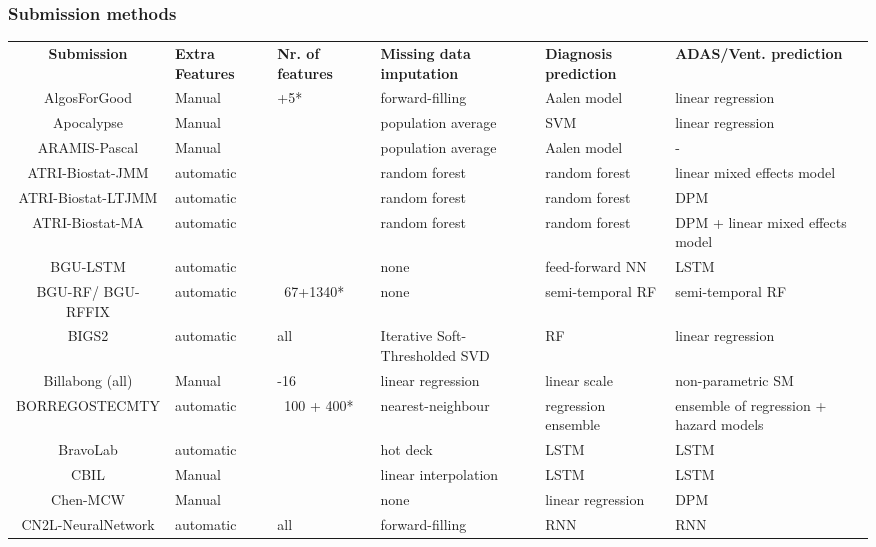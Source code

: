 \documentclass[8pt,xcolor=table,aspectratio=169]{beamer}
\begin{document}
\begin{frame}
\frametitle{Submission methods}



\begin{table}
 \centering
 \fontsize{4}{6}\selectfont
 \begin{tabular}{c | >{\centering\arraybackslash}p{1.3cm} >{\centering\arraybackslash}p{1.2cm} >{\centering\arraybackslash}p{2cm} >{\centering\arraybackslash}p{2cm} >{\centering\arraybackslash}p{2cm}}
\textbf{Submission} & \textbf{Extra Features}  & \textbf{Nr. of features} & \textbf{Missing data imputation} & \textbf{Diagnosis prediction} & \textbf{ADAS/Vent. prediction}\\
\Xhline{1.5\arrayrulewidth}
AlgosForGood & Manual & 16+5* & forward-filling & Aalen model & linear regression\\
Apocalypse & Manual & 16 & population average & SVM & linear regression\\
ARAMIS-Pascal & Manual & 20 & population average & Aalen model & -\\
ATRI-Biostat-JMM & automatic & 15 & random forest & random forest & linear mixed effects model\\
ATRI-Biostat-LTJMM & automatic & 15 & random forest & random forest & DPM\\
ATRI-Biostat-MA & automatic & 15 & random forest & random forest & DPM + linear mixed effects model\\
BGU-LSTM & automatic & 67 & none & feed-forward NN & LSTM\\
BGU-RF/ BGU-RFFIX & automatic & ~67+1340* & none & semi-temporal RF & semi-temporal RF\\
BIGS2 & automatic & all & Iterative Soft-Thresholded SVD & RF & linear regression\\
Billabong (all) & Manual & 15-16 & linear regression & linear scale & non-parametric SM\\
BORREGOSTECMTY & automatic & ~100 + 400* & nearest-neighbour & regression ensemble & ensemble of regression + hazard models \\
BravoLab & automatic & 25 & hot deck & LSTM & LSTM\\
CBIL & Manual & 21 & linear interpolation & LSTM & LSTM\\
Chen-MCW & Manual & 9 & none & linear regression & DPM\\
CN2L-NeuralNetwork & automatic & all & forward-filling & RNN & RNN\\

\end{tabular}
\end{table}
\end{frame}
\end{document}

